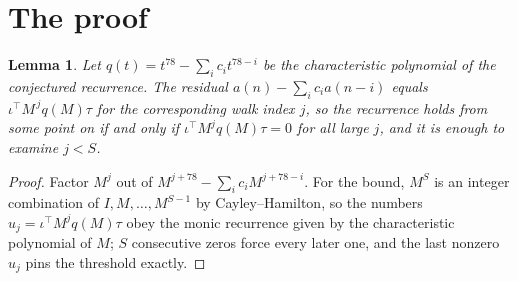\documentclass[11pt,a4paper]{article}
\theoremstyle{plain}
\newtheorem{lemma}[theorem]{Lemma}
\theoremstyle{definition}
\begin{document}
\section{The proof}

\begin{lemma}\label{lem:crit}
Let $q(t)=t^{78}-\sum_i c_it^{78-i}$ be the characteristic polynomial of the
conjectured recurrence. The residual $a(n)-\sum_ic_ia(n-i)$ equals
$\iota^{\!\top}M^{\,j}q(M)\tau$ for the corresponding walk index $j$, so the recurrence
holds from some point on if and only if $\iota^{\!\top}M^{j}q(M)\tau=0$ for all large $j$,
and it is enough to examine $j<S$.
\end{lemma}

\begin{proof}
Factor $M^{j}$ out of $M^{j+78}-\sum_ic_iM^{j+78-i}$. For the bound, $M^{S}$
is an integer combination of $I,M,\dots,M^{S-1}$ by Cayley--Hamilton, so the numbers
$u_j=\iota^{\!\top}M^{j}q(M)\tau$ obey the monic recurrence given by the characteristic
polynomial of $M$; $S$ consecutive zeros force every later one, and the last nonzero $u_j$
pins the threshold exactly.
\end{proof}
\end{document}
